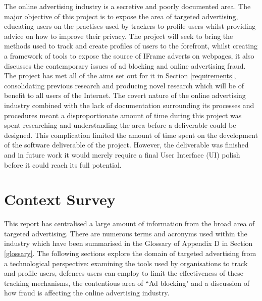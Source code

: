 \documentclass[12pt]{article}
\begin{document}
The online advertising industry is a secretive and poorly documented area. The major objective of this project is to expose the area of targeted advertising, educating users on the practises used by trackers to profile users whilst providing advice on how to improve their privacy. The project will seek to bring the methods used to track and create profiles of users to the forefront, whilst creating a framework of tools to expose the source of IFrame adverts on webpages, it also discusses the contemporary issues of ad blocking and online advertising fraud. The project has met all of the aims set out for it in Section \ref{requirements}, consolidating previous research and producing novel research which will be of benefit to all users of the Internet. The covert nature of the online advertising industry combined with the lack of documentation surrounding its processes and procedures meant a disproportionate amount of time during this project was spent researching and understanding the area before a deliverable could be designed. This complication limited the amount of time spent on the development of the software deliverable of the project. However, the deliverable was finished and in future work it would merely require a final User Interface (UI) polish before it could reach its full potential.   \\

\section{Context Survey}
This report has centralised a large amount of information from the broad area of targeted advertising. There are numerous terms and acronyms used within the industry which have been summarised in the Glossary of Appendix D in Section \ref{glossary}. The following sections explore the domain of targeted advertising from a technological perspective: examining the tools used by organisations to track and profile users, defences users can employ to limit the effectiveness of these tracking mechanisms, the contentious area of ``Ad blocking" and a discussion of how fraud is affecting the online advertising industry.   
\end{document}
